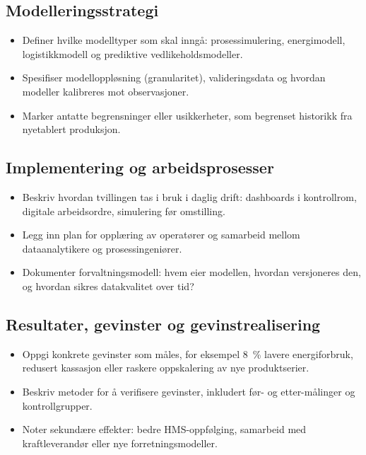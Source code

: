 \subsection{Modelleringsstrategi}
\begin{itemize}
    \item Definer hvilke modelltyper som skal inngå: prosessimulering, energimodell, logistikkmodell og prediktive vedlikeholdsmodeller.
    \item Spesifiser modelloppløsning (granularitet), valideringsdata og hvordan modeller kalibreres mot observasjoner.
    \item Marker antatte begrensninger eller usikkerheter, som begrenset historikk fra nyetablert produksjon.
\end{itemize}

\subsection{Implementering og arbeidsprosesser}
\begin{itemize}
    \item Beskriv hvordan tvillingen tas i bruk i daglig drift: dashboards i kontrollrom, digitale arbeidsordre, simulering før omstilling.
    \item Legg inn plan for opplæring av operatører og samarbeid mellom dataanalytikere og prosessingeniører.
    \item Dokumenter forvaltningsmodell: hvem eier modellen, hvordan versjoneres den, og hvordan sikres datakvalitet over tid?
\end{itemize}

\subsection{Resultater, gevinster og gevinstrealisering}
\begin{itemize}
    \item Oppgi konkrete gevinster som måles, for eksempel 8~\% lavere energiforbruk, redusert kassasjon eller raskere oppskalering av nye produktserier.
    \item Beskriv metoder for å verifisere gevinster, inkludert før- og etter-målinger og kontrollgrupper.
    \item Noter sekundære effekter: bedre HMS-oppfølging, samarbeid med kraftleverandør eller nye forretningsmodeller.
\end{itemize}

